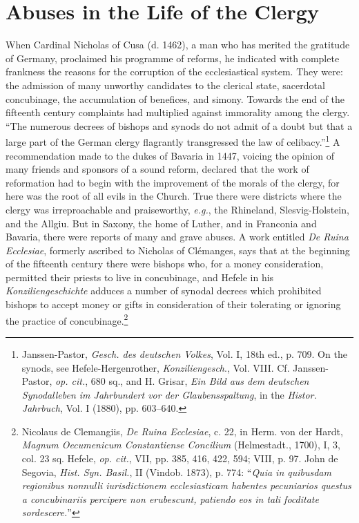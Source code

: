 \section{Abuses in the Life of the Clergy}

When Cardinal Nicholas of Cusa (d. 1462), a man who has
merited the gratitude of Germany, proclaimed his programme of
reforms, he indicated with complete frankness the reasons for the
corruption of the ecclesiastical system. They were: the admission
of many unworthy candidates to the clerical state, sacerdotal concubinage,
the accumulation of benefices, and simony. Towards the
end of the fifteenth century complaints had multiplied against immorality
among the clergy. “The numerous decrees of bishops and
synods do not admit of a doubt but that a large part of the German
clergy flagrantly transgressed the law of celibacy.”\footnote
{Janssen-Pastor, \textit{Gesch. des deutschen Volkes}, Vol. I, 18th ed., p. 709. On the synods,
see Hefele-Hergenrother, \textit{Konziliengesch}., Vol. VIII. Cf. Janssen-Pastor, \textit{op. cit.}, 680 sq., and
H. Grisar, \textit{Ein Bild aus dem deutschen Synodalleben im Jahrbundert vor der Glaubensspaltung},
in the \textit{Histor. Jahrbuch}, Vol. I (1880), pp. 603--640.}
A recommendation made to the dukes of Bavaria in 1447, voicing the opinion
of many friends and sponsors of a sound reform, declared that the
work of reformation had to begin with the improvement of the
morals of the clergy, for here was the root of all evils in the Church.
True there were districts where the clergy was irreproachable and
praiseworthy, \textit{e.g.}, the Rhineland, Slesvig-Holstein, and the Allgiu.
But in Saxony, the home of Luther, and in Franconia and Bavaria,
there were reports of many and grave abuses. A work entitled \textit{De
Ruina Ecclesiae}, formerly ascribed to Nicholas of Clémanges, says
that at the beginning of the fifteenth century there were bishops
who, for a money consideration, permitted their priests to live in
concubinage, and Hefele in his \textit{Konziliengeschichte} adduces a number
of synodal decrees which prohibited bishops to accept money or
gifts in consideration of their tolerating or ignoring the practice
of concubinage.\footnote
{Nicolaus de Clemangiis, \textit{De Ruina Ecclesiae}, c. 22, in Herm. von der Hardt, \textit{Magnum
Oecumenicum Constantiense Concilium} (Helmestadt., 1700), I, 3, col. 23 sq. Hefele,
\textit{op. cit.}, VII, pp. 385, 416, 422, 594; VIII, p. 97. John de Segovia, \textit{Hist. Syn. Basil.}, II
(Vindob. 1873), p. 774: “\textit{Quia in quibusdam regionibus nonnulli iurisdictionem ecclesiasticam habentes pecuniarios questus a concubinariis percipere non erubescunt, patiendo eos in
tali focditate sordescere.}”}

